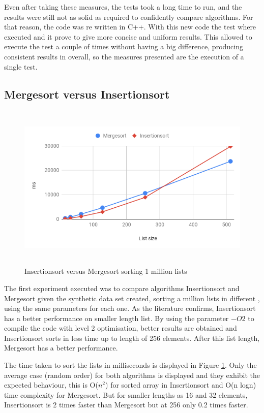 \documentclass[a4paper,12pt]{article}
\begin{document}
Even after taking these measures, the tests took a long time to run, and the results were still not as solid as required to confidently compare algorithms. For that reason, the code was re written in C++. With this new code the test where  executed and it prove to give more concise and uniform results. This allowed to execute the test a couple of times without having a big difference, producing consistent results in overall, so the measures presented are the execution of a single test.

\subsection{Mergesort versus Insertionsort}

\begin{figure}[H]
    \centering
     \includegraphics[height=8cm,keepaspectratio]{./images/InsertionvsMerge.png}
    \caption{Insertionsort versus Mergesort sorting 1 million lists}
    \label{fig:InsrtVsMerge}
\end{figure}

The first experiment executed was to compare algorithms Insertionsort and Mergesort given the synthetic data set created, sorting a million lists in different , using the same parameters for each one. As the literature confirms, Insertionsort has a better performance on smaller length list. By using the parameter $-O2$ to compile the code with level 2 optimisation, better results are obtained and Insertionsort sorts in less time up to length of 256 elements. After this list length, Mergesort has a better performance.

The time taken to sort the lists in milliseconds is displayed in Figure \ref{fig:InsrtVsMerge}. Only the average case (random order) for both algorithms is displayed and they exhibit the expected behaviour, this is  O(${n}^2$) for sorted array in Insertionsort and O(n logn) time complexity for Mergesort.  But for smaller lengths as 16 and 32 elements, Insertionsort is 2 times faster than Mergesort but at 256 only 0.2 times faster. 
\end{document}
